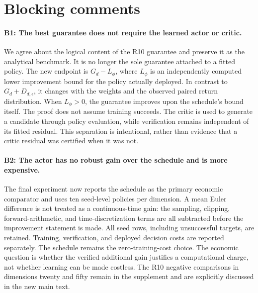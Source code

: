 

\section*{Blocking comments}
\paragraph{B1: The best guarantee does not require the learned actor or critic.}
We agree about the logical content of the R10 guarantee and preserve it as the analytical benchmark. It is no longer the sole guarantee attached to a fitted policy. The new endpoint is $G_d-L_\phi$, where $L_\phi$ is an independently computed lower improvement bound for the policy actually deployed. In contrast to $G_d+D_{d,\epsilon}$, it changes with the weights and the observed paired return distribution. When $L_\phi>0$, the guarantee improves upon the schedule's bound itself. The proof does not assume training succeeds. The critic is used to generate a candidate through policy evaluation, while verification remains independent of its fitted residual. This separation is intentional, rather than evidence that a critic residual was certified when it was not.

\paragraph{B2: The actor has no robust gain over the schedule and is more expensive.}
The final experiment now reports the schedule as the primary economic comparator and uses ten seed-level policies per dimension. A mean Euler difference is not treated as a continuous-time gain: the sampling, clipping, forward-arithmetic, and time-discretization terms are all subtracted before the improvement statement is made. All seed rows, including unsuccessful targets, are retained. Training, verification, and deployed decision costs are reported separately. The schedule remains the zero-training-cost choice. The economic question is whether the verified additional gain justifies a computational charge, not whether learning can be made costless. The R10 negative comparisons in dimensions twenty and fifty remain in the supplement and are explicitly discussed in the new main text.

